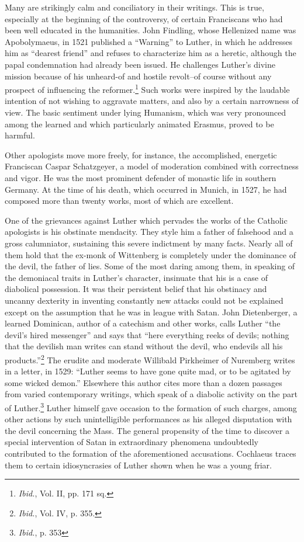Many are strikingly calm and conciliatory in their writings. This is
true, especially at the beginning of the controversy, of certain Franciscans
who had been well educated in the humanities. John Findling,
whose Hellenized name was Apobolymaeus, in 1521 published a
“Warning” to Luther, in which he addresses him as “dearest friend”
and refuses to characterize him as a heretic, although the papal condemnation
had already been issued. He challenges Luther’s divine
mission because of his unheard-of and hostile revolt--of course without
any prospect of influencing the reformer.\footnote{\textit{Ibid.}, Vol. II, pp. 171 sq.}
Such works were inspired
by the laudable intention of not wishing to aggravate matters,
and also by a certain narrowness of view. The basic sentiment under
lying Humanism, which was very pronounced among the learned and
which particularly animated Erasmus, proved to be harmful.

Other apologists move more freely, for instance, the accomplished,
energetic Franciscan Caspar Schatzgeyer, a model of moderation combined
with correctness and vigor. He was the most prominent defender
of monastic life in southern Germany. At the time of his death,
which occurred in Munich, in 1527, he had composed more than
twenty works, most of which are excellent.

One of the grievances against Luther which pervades the works of
the Catholic apologists is his obstinate mendacity. They style him a
father of falsehood and a gross calumniator, sustaining this severe
indictment by many facts. Nearly all of them hold that the ex-monk
of Wittenberg is completely under the dominance of the devil, the
father of lies. Some of the most daring among them, in speaking of
the demoniacal traits in Luther’s character, insinuate that his is a
case of diabolical possession. It was their persistent belief that his
obstinacy and uncanny dexterity in inventing constantly new attacks
could not be explained except on the assumption that he was in league
with Satan. John Dietenberger, a learned Dominican, author of a
catechism and other works, calls Luther “the devil’s hired messenger”
and says that “here everything reeks of devils; nothing that the
devilish man writes can stand without the devil, who endevils all his
products.”\footnote{\textit{Ibid.}, Vol. IV, p. 355.}
The erudite and moderate Willibald Pirkheimer of
Nuremberg writes in a letter, in 1529: “Luther seems to have gone
quite mad, or to be agitated by some wicked demon.” Elsewhere this
author cites more than a dozen passages from varied contemporary
writings, which speak of a diabolic activity on the part of Luther.\footnote{\textit{Ibid.}, p. 353}
Luther himself gave occasion to the formation of such charges, among
other actions by such unintelligible performances as his alleged disputation
with the devil concerning the Mass. The general propensity
of the time to discover a special intervention of Satan in extraordinary
phenomena undoubtedly contributed to the formation of the
aforementioned accusations. Cochlaeus traces them to certain idiosyncrasies
of Luther shown when he was a young friar.

